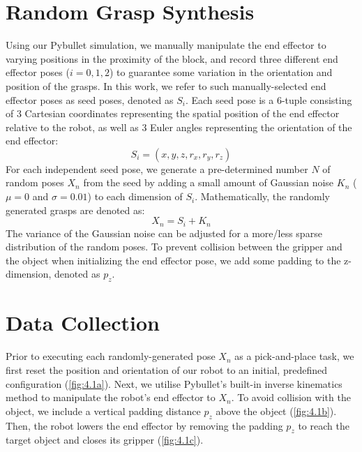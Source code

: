 \documentclass[12pt, a4paper]{report}
\theoremstyle{definition}
\begin{document}
\section{Random Grasp Synthesis}
\label{sec:4.1}
Using our Pybullet simulation, we manually manipulate the end effector to varying positions in the proximity of the block, and record three different end effector poses ($i=0,1,2$) to guarantee some variation in the orientation and position of the grasps. In this work, we refer to such manually-selected end effector poses as seed poses, denoted as $S_i$. Each seed pose is a 6-tuple consisting of 3 Cartesian coordinates representing the spatial position of the end effector relative to the robot, as well as 3 Euler angles representing the orientation of the end effector:
\begin{equation}
    S_i=(x,y,z,r_x,r_y,r_z)
\end{equation}
For each independent seed pose, we generate a pre-determined number $N$ of random poses $X_n$ from the seed by adding a small amount of Gaussian noise $K_n$ ($\mu=0$ and $\sigma=0.01$) to each dimension of $S_i$. Mathematically, the randomly generated grasps are denoted as:
\begin{equation}
    X_n=S_i+K_n
\end{equation}
The variance of the Gaussian noise can be adjusted for a more/less sparse distribution of the random poses. To prevent collision between the gripper and the object when initializing the end effector pose, we add some padding to the z-dimension, denoted as $p_z$.


\section{Data Collection}
\label{sec:4.2}
Prior to executing each randomly-generated pose $X_n$ as a pick-and-place task, we first reset the position and orientation of our robot to an initial, predefined configuration (\ref{fig:4.1a}). Next, we utilise Pybullet's built-in inverse kinematics method to manipulate the robot's end effector to $X_n$. To avoid collision with the object, we include a vertical padding distance $p_z$ above the object (\ref{fig:4.1b}). Then, the robot lowers the end effector by removing the padding $p_z$ to reach the target object and closes its gripper (\ref{fig:4.1c}).
\end{document}
